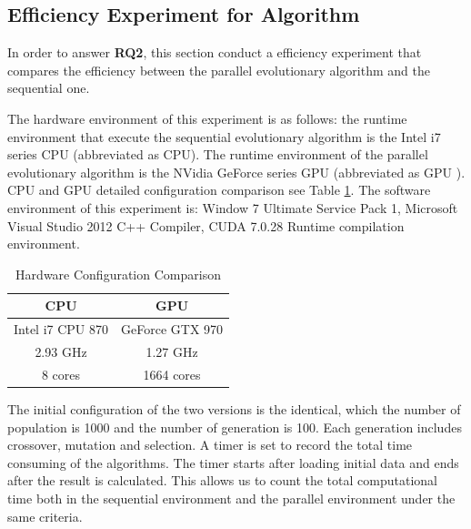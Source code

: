 \subsection{Efficiency Experiment for Algorithm}
%
In order to answer \textbf{RQ2}, this section conduct a efficiency experiment
that compares the efficiency between the parallel evolutionary algorithm and the
sequential one.

The hardware environment of this experiment is as follows: the runtime
environment that execute the sequential evolutionary algorithm is the Intel i7
series CPU (abbreviated as CPU). The runtime environment of the parallel
evolutionary algorithm is the NVidia GeForce series GPU (abbreviated as GPU
). CPU and GPU detailed configuration comparison see Table \ref{tab:cpugpu}. The
software environment of this experiment is: Window 7 Ultimate Service Pack 1,
Microsoft Visual Studio 2012 C++ Compiler, CUDA 7.0.28 Runtime compilation
environment.

\begin{table}[!ht]
  \centering
  \caption{Hardware Configuration Comparison}
  \label{tab:cpugpu}
  \begin{tabular}{c|c}
    \hline
    CPU & GPU  \\
    \hline
    \hspace{.5cm} Intel i7 CPU 870 \hspace{.5cm} & \hspace{.5cm} GeForce GTX 970 \hspace{.5cm} \\
    2.93 GHz & 1.27 GHz \\
    8 cores & 1664 cores \\
    \hline
  \end{tabular}
\end{table}

The initial configuration of the two versions is the identical, which the number
of population is 1000 and the number of generation is 100. Each generation
includes crossover, mutation and selection. A timer is set to record the total
time consuming of the algorithms. The timer starts after loading initial data
and ends after the result is calculated. This allows us to count the total
computational time both in the sequential environment and the parallel
environment under the same criteria.


